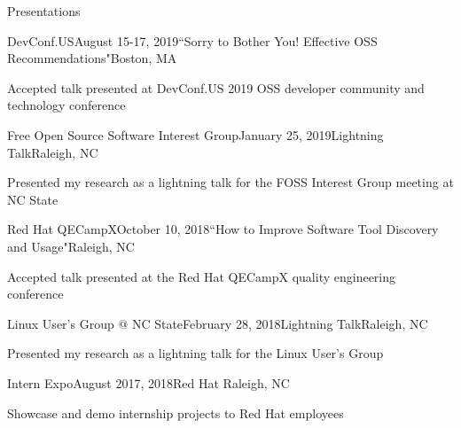 \documentclass{resume} %
\begin{document}
\vspace{-10pt}

\begin{rSection}{Presentations}

\begin{rSubsection}{DevConf.US}{August 15-17, 2019}{``Sorry to Bother You! Effective OSS Recommendations"}{Boston, MA}
\item Accepted talk presented at DevConf.US 2019 OSS developer community and technology conference
\end{rSubsection}
\vspace{-5pt}

\begin{rSubsection}{Free Open Source Software Interest Group}{January 25, 2019}{Lightning Talk}{Raleigh, NC}
\item Presented my research as a lightning talk for the FOSS Interest Group meeting at NC State
\end{rSubsection}
\vspace{-5pt}

\begin{rSubsection}{Red Hat QECampX}{October 10, 2018}{``How to Improve Software Tool Discovery and Usage"}{Raleigh, NC}
\item Accepted talk presented at the Red Hat QECampX quality engineering conference
\end{rSubsection}
\vspace{-5pt}

\begin{rSubsection}{Linux User's Group @ NC State}{February 28, 2018}{Lightning Talk}{Raleigh, NC}
\item Presented my research as a lightning talk for the Linux User's Group
\end{rSubsection}
\vspace{-5pt}

\begin{rSubsection}{Intern Expo}{August 2017, 2018}{Red Hat }{Raleigh, NC}
\item Showcase and demo internship projects to Red Hat employees
\end{rSubsection}
\vspace{-5pt}


\end{rSection}
\end{document}
